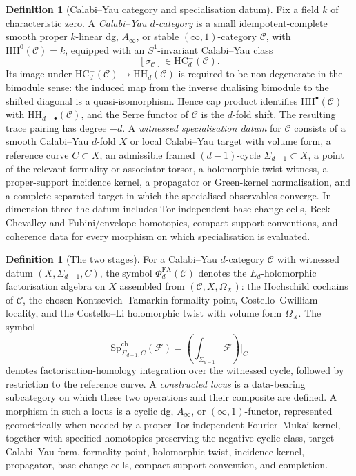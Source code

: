 \documentclass[11pt]{amsart}
\providecommand{\cC}{\mathcal{C}}
\providecommand{\cF}{\mathcal{F}}
\providecommand{\PhiFA}{\Phi^{\mathrm{FA}}}
\providecommand{\SpCh}{\mathrm{Sp}^{\mathrm{ch}}}
\providecommand{\HH}{\mathrm{HH}}
\providecommand{\HC}{\mathrm{HC}}
\theoremstyle{definition}
\newtheorem{definition}[theorem]{Definition}
\theoremstyle{remark}
\begin{document}
\begin{definition}[Calabi--Yau category and specialisation datum]
Fix a field \(k\) of characteristic zero. A \emph{Calabi--Yau \(d\)-category}
is a small idempotent-complete smooth proper \(k\)-linear dg,
\(A_\infty\), or stable \((\infty,1)\)-category \(\cC\), with
\(\HH^0(\cC)=k\), equipped with an \(S^1\)-invariant Calabi--Yau class
\[
        [\sigma_\cC]\in \HC^-_d(\cC).
\]
Its image under \(\HC^-_d(\cC)\to \HH_d(\cC)\) is required to be
non-degenerate in the bimodule sense: the induced map from the inverse
dualising bimodule to the shifted diagonal is a quasi-isomorphism. Hence
cap product identifies \(\HH^\bullet(\cC)\) with
\(\HH_{d-\bullet}(\cC)\), and the Serre functor of \(\cC\) is the
\(d\)-fold shift. The resulting trace pairing has degree \(-d\). A
\emph{witnessed specialisation datum} for
\(\cC\) consists of a smooth Calabi--Yau \(d\)-fold \(X\) or local
Calabi--Yau target with volume form, a reference curve \(C\subset X\), an
admissible framed \((d-1)\)-cycle \(\Sigma_{d-1}\subset X\), a point of the
relevant formality or associator torsor, a holomorphic-twist witness, a
proper-support incidence kernel, a propagator or Green-kernel
normalisation, and a complete separated target in which the specialised
observables converge. In dimension three the datum includes
Tor-independent base-change cells, Beck--Chevalley and Fubini/envelope
homotopies, compact-support conventions, and coherence data for every
morphism on which specialisation is evaluated.
\end{definition}

\begin{definition}[The two stages]
For a Calabi--Yau \(d\)-category \(\cC\) with witnessed datum
\((X,\Sigma_{d-1},C)\), the symbol \(\PhiFA_d(\cC)\) denotes the
\(E_d\)-holomorphic factorisation algebra on \(X\) assembled from
\((\cC,X,\Omega_X)\): the Hochschild cochains of \(\cC\), the chosen
Kontsevich--Tamarkin formality point, Costello--Gwilliam locality, and the
Costello--Li holomorphic twist with volume form \(\Omega_X\). The symbol
\[
        \SpCh_{\Sigma_{d-1},C}(\cF)
        =
        \left(\int_{\Sigma_{d-1}}\cF\right)\bigg|_C
\]
denotes factorisation-homology integration over the witnessed cycle,
followed by restriction to the reference curve. A \emph{constructed locus}
is a data-bearing subcategory on which these two operations and their
composite are defined. A morphism in such a locus is a cyclic dg,
\(A_\infty\), or \((\infty,1)\)-functor, represented geometrically when
needed by a proper Tor-independent Fourier--Mukai kernel, together with
specified homotopies preserving the negative-cyclic class, target
Calabi--Yau form, formality point, holomorphic twist, incidence kernel,
propagator, base-change cells, compact-support convention, and completion.
\end{definition}
\end{document}
